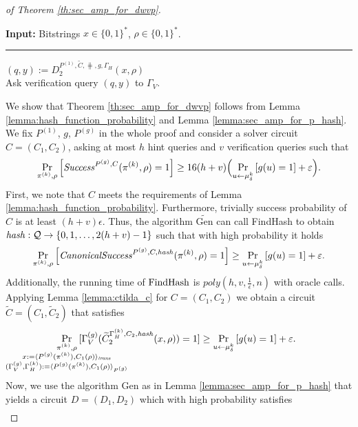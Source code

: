 \begin{proof}[of Theorem \ref{th:sec_amp_for_dwvp}]
\begin{codeblock}
  \textbf{Input:}  Bitstrings $x \in \{0,1\}^{*}$, $\rho \in \{0,1\}^{*}$.
  \medskip\hrule
  $(q, y) := D_2^{P^{(1)}, \widetilde{C}, \hash, g, \Gamma_H}(x, \rho)$ \\
  Ask verification query $(q,y)$ to $\Gamma_V$.
\end{codeblock}
%
We show that Theorem \ref{th:sec_amp_for_dwvp} follows from Lemma \ref{lemma:hash_function_probability} and Lemma \ref{lemma:sec_amp_for_p_hash}.
We fix $P^{(1)}$, $g$, $P^{(g)}$ in the whole proof and consider a solver circuit $C = (C_1, C_2)$, asking at most $h$ hint queries and $v$ verification queries such that
\begin{align*}
    \underset{\pi^{(k)}, \rho}{\Pr}\left[\operatorname{\mathit{Success}}^{P^{(g)}, C}(\pi^{(k)}, \rho) = 1\right] \geq 16(h+v)\Big(\underset{u \leftarrow \mu_\delta^k}{\Pr}\left[g(u) = 1\right] + \varepsilon\Big).
\end{align*}
First, we note that $C$ meets the requirements of Lemma \ref{lemma:hash_function_probability}.
Furthermore, trivially success probability of $C$ is at least $(h+v)\epsilon$.
Thus, the algorithm $\widetilde{\text{Gen}}$ can call FindHash to obtain $\operatorname{\mathit{hash}}:\mathcal{Q} \rightarrow \{0,1,\dotsc, 2(h+v)-1\}$
such that with high probability it holds
\begin{align*}
    \underset{\pi^{(k)}, \rho}{\Pr}\left[\operatorname{\mathit{CanonicalSuccess}}^{P^{(g)}, C, \operatorname{\mathit{hash}}}(\pi^{(k)}, \rho) = 1\right] \geq \underset{u \leftarrow \mu_\delta^k}{\Pr}\left[g(u) = 1\right] + \varepsilon.
\end{align*}
Additionally, the running time of $\operatorname{\text{FindHash}}$ is $\mathit{poly}(h,v,\frac{1}{\epsilon},n)$ with oracle calls.
Applying Lemma \ref{lemma:ctilda_c} for $C=(C_1, C_2)$ we obtain a circuit $\widetilde{C} = (C_1, \widetilde{C}_2)$ that satisfies
\begin{align*}
    \underset{
      \mathclap {
      \substack{\pi^{(k)}, \rho \\
        x := \langle P^{(g)}(\pi^{(k)}), C_1(\rho) \rangle_{\mathit{trans}} \\
        (\Gamma_V^{(g)}, \Gamma_H^{(k)}) := \langle P^{(g)}(\pi^{(k)}), C_1(\rho) \rangle_{P^{(g)}}
      }}}
    {\Pr}\mkern13mu[\Gamma_V^{(g)}(\widetilde{C}_2^{\Gamma_H^{(k)}, C_2, \hash}(x, \rho)) = 1]
    \geq
\underset{u \leftarrow \mu_\delta^k}{\Pr}\left[g(u) = 1\right] + \varepsilon.
\end{align*}
Now, we use the algorithm Gen as in Lemma \ref{lemma:sec_amp_for_p_hash} that yields a circuit $D = (D_1, D_2)$ which with high probability satisfies
\begin{align}

\end{align}
\end{proof}
